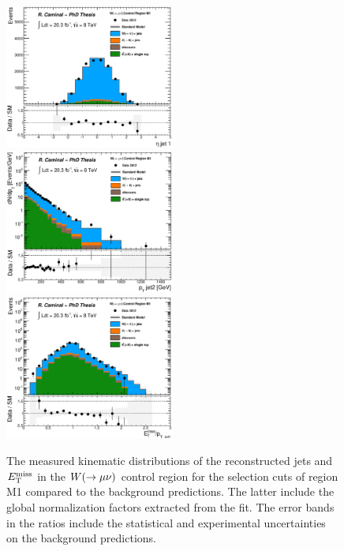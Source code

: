 \begin{figure}[!ht]
\begin{center}
{      \includegraphics[width=0.495\textwidth]{MonojetAnalysis/Figures/plot_Stop_A6_CRwmn_eta1_fitted.eps}
    }
    \mbox{
      \includegraphics[width=0.495\textwidth]{MonojetAnalysis/Figures/plot_Stop_A6_CRwmn_pt2_fitted.eps}
      \includegraphics[width=0.495\textwidth]{MonojetAnalysis/Figures/plot_Stop_A6_CRwmn_metpt1_fitted.eps}
    }
  \end{center}
  \caption[Kinematic distributions of the reconstructed jets and $\met$ in the $\wmn$ control region for the selection cuts of region M1, after the normalization factors extracted from the fit have been applied.]{The measured kinematic distributions of the reconstructed jets and $\met$ in the $\wmn$ control region for the selection cuts of region M1 compared to the background predictions. The latter include the global normalization factors extracted from the fit. The error bands in the ratios include the statistical and experimental uncertainties on the background predictions.}
  \label{fig:Plot_M1_CRwmn_Jetkinematics}
\end{figure}

